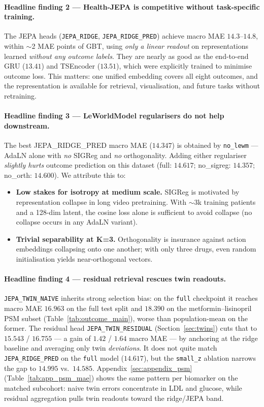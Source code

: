 \paragraph{Headline finding 2 --- Health-JEPA is competitive without
task-specific training.} The JEPA heads (\texttt{JEPA\_RIDGE},
\texttt{JEPA\_RIDGE\_PRED}) achieve macro MAE $14.3$--$14.8$, within
$\sim$2 MAE points of GBT, using \emph{only a linear readout} on
representations learned \emph{without any outcome labels}. They are
nearly as good as the end-to-end GRU ($13.41$) and TSEncoder ($13.51$),
which were explicitly trained to minimise outcome loss. This matters:
one unified embedding covers all eight outcomes, and the representation
is available for retrieval, visualisation, and future tasks without
retraining.

\paragraph{Headline finding 3 --- LeWorldModel regularisers do not help
downstream.} The best JEPA\_RIDGE\_PRED macro MAE ($14.347$) is obtained
by \texttt{no\_lewm} --- AdaLN alone with \emph{no} SIGReg and \emph{no}
orthogonality. Adding either regulariser \emph{slightly hurts} outcome
prediction on this dataset (full: $14.617$; no\_sigreg: $14.357$;
no\_orth: $14.600$). We attribute this to:
\begin{itemize}[leftmargin=*]
  \item \textbf{Low stakes for isotropy at medium scale.} SIGReg is
  motivated by representation collapse in long video pretraining. With
  $\sim$3k training patients and a 128-dim latent, the cosine loss
  alone is sufficient to avoid collapse (no collapse occurs in any
  AdaLN variant).
  \item \textbf{Trivial separability at K=3.} Orthogonality is insurance
  against action embeddings collapsing onto one another; with only three
  drugs, even random initialisation yields near-orthogonal vectors.
\end{itemize}

\paragraph{Headline finding 4 --- residual retrieval rescues twin readouts.}
\texttt{JEPA\_TWIN\_NAIVE} inherits strong selection bias: on the
\texttt{full} checkpoint it reaches macro MAE $16.963$ on the full test
split and $18.390$ on the metformin--lisinopril PSM subset
(Table~\ref{tab:outcome_main}), worse than population-mean on the former.
The residual head \texttt{JEPA\_TWIN\_RESIDUAL} (Section~\ref{sec:twins})
cuts that to $15.543$ / $16.755$ --- a gain of $1.42$ / $1.64$ macro MAE
--- by anchoring at the ridge baseline and averaging only twin
\emph{deviations}. It does not quite match \texttt{JEPA\_RIDGE\_PRED} on
the \texttt{full} model ($14.617$), but the \texttt{small\_z} ablation
narrows the gap to $14.995$ vs.\ $14.585$. Appendix~\ref{sec:appendix_psm} (Table~\ref{tab:app_psm_mae})
shows the same pattern per biomarker on the matched subcohort: naive twin
errors concentrate in LDL and glucose, while residual aggregation pulls
twin readouts toward the ridge/JEPA band.

